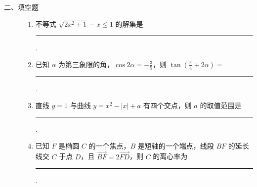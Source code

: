 \begin{description}

    \item[二、填空题]

    \begin{enumerate}[leftmargin=5pt]

      \addtocounter{enumi}{+12}

        \item 不等式 \( \sqrt{2x^{2}+1}-x\leqslant1 \) 的解集是\rule[-0.3ex]{3em}{0.4pt}.

        \item 已知 \(\alpha\) 为第三象限的角，\(\cos 2\alpha = -\frac{3}{5}\)，则 \(\tan \left(\frac{\pi}{4} + 2\alpha\right) =\)\rule[-0.3ex]{3em}{0.4pt}.

        \item 直线 \( y = 1 \) 与曲线 \( y = x^2 - |x| + a \) 有四个交点，则 \( a \) 的取值范围是\rule[-0.3ex]{3em}{0.4pt}.

        \item 已知 \(F\) 是椭圆 \(C\) 的一个焦点，\(B\) 是短轴的一个端点，线段 \(BF\) 的延长线交 \(C\) 于点 \(D\)，且 \(\overrightarrow{BF} = 2\overrightarrow{FD}\)，则 \(C\) 的离心率为\rule[-0.3ex]{3em}{0.4pt}.

    \end{enumerate}

\end{description}

